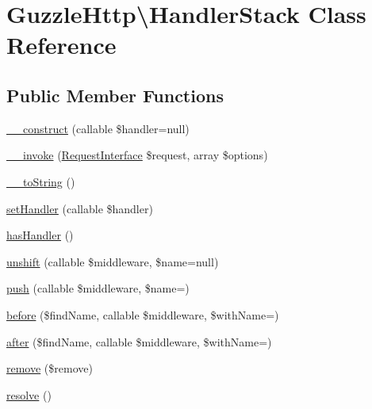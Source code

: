 \hypertarget{classGuzzleHttp_1_1HandlerStack}{}\section{Guzzle\+Http\textbackslash{}Handler\+Stack Class Reference}
\label{classGuzzleHttp_1_1HandlerStack}
\subsection*{Public Member Functions}
\begin{DoxyCompactItemize}
\item 
\hyperlink{classGuzzleHttp_1_1HandlerStack_acd991cc07f50dbb5ca301f703c11338f}{\+\_\+\+\_\+construct} (callable \$handler=null)
\item 
\hyperlink{classGuzzleHttp_1_1HandlerStack_a96c996cb646ff14c1e9302ffed3dde54}{\+\_\+\+\_\+invoke} (\hyperlink{interfacePsr_1_1Http_1_1Message_1_1RequestInterface}{Request\+Interface} \$request, array \$options)
\item 
\hyperlink{classGuzzleHttp_1_1HandlerStack_a1e3074138c9cbfe2ab5ae3a35b6581d0}{\+\_\+\+\_\+to\+String} ()
\item 
\hyperlink{classGuzzleHttp_1_1HandlerStack_abe01e072281e5c70dbb03db23bde22f0}{set\+Handler} (callable \$handler)
\item 
\hyperlink{classGuzzleHttp_1_1HandlerStack_ae0f44f5088fb05b053a56fe84f264637}{has\+Handler} ()
\item 
\hyperlink{classGuzzleHttp_1_1HandlerStack_a545c84f9b80b8a4b66ff845c45484808}{unshift} (callable \$middleware, \$name=null)
\item 
\hyperlink{classGuzzleHttp_1_1HandlerStack_a035eb8174a7cf962fe6064f5dda2a61e}{push} (callable \$middleware, \$name=\textquotesingle{}\textquotesingle{})
\item 
\hyperlink{classGuzzleHttp_1_1HandlerStack_aeca62dd3e371afcbd54d7e0d90897051}{before} (\$find\+Name, callable \$middleware, \$with\+Name=\textquotesingle{}\textquotesingle{})
\item 
\hyperlink{classGuzzleHttp_1_1HandlerStack_a7c217d7774bc2e0fa9d9f3e9502b7cd2}{after} (\$find\+Name, callable \$middleware, \$with\+Name=\textquotesingle{}\textquotesingle{})
\item 
\hyperlink{classGuzzleHttp_1_1HandlerStack_a54107f838fb918ab3f1a017007a635ab}{remove} (\$remove)
\item 
\hyperlink{classGuzzleHttp_1_1HandlerStack_a6b8ed28dc14bef746d5a11e536d0f929}{resolve} ()
\end{DoxyCompactItemize}
